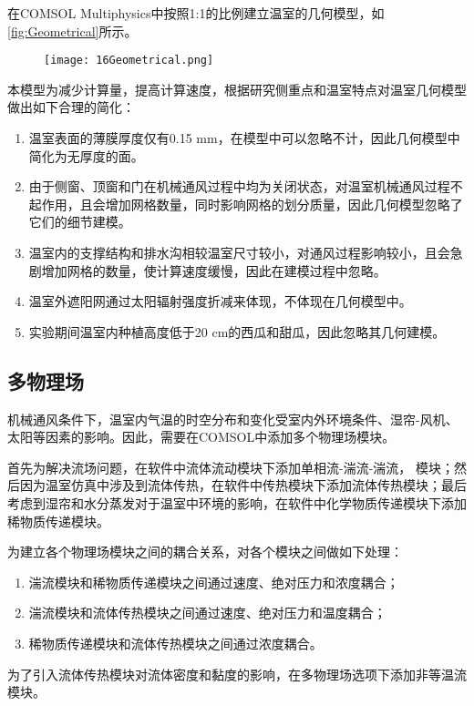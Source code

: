 在COMSOL Multiphysics中按照1:1的比例建立温室的几何模型，如\ref{fig:Geometrical}所示。
 	  	\begin{figure}[!htp]
  			\centering
 			\texttt{[image: 16Geometrical.png]}
		\end{figure}
本模型为减少计算量，提高计算速度，根据研究侧重点和温室特点对温室几何模型做出如下合理的简化：
	\begin{enumerate}
		\item 温室表面的薄膜厚度仅有0.15 mm，在模型中可以忽略不计，因此几何模型中简化为无厚度的面。
		\item 由于侧窗、顶窗和门在机械通风过程中均为关闭状态，对温室机械通风过程不起作用，且会增加网格数量，同时影响网格的划分质量，因此几何模型忽略了它们的细节建模。
		\item 温室内的支撑结构和排水沟相较温室尺寸较小，对通风过程影响较小，且会急剧增加网格的数量，使计算速度缓慢，因此在建模过程中忽略。
		\item 温室外遮阳网通过太阳辐射强度折减来体现，不体现在几何模型中。
		\item 实验期间温室内种植高度低于20 cm的西瓜和甜瓜，因此忽略其几何建模。
	\end{enumerate}
	
	\subsection{多物理场}
	机械通风条件下，温室内气温的时空分布和变化受室内外环境条件、湿帘-风机、太阳等因素的影响。因此，需要在COMSOL中添加多个物理场模块。
	
首先为解决流场问题，在软件中流体流动模块下添加单相流-湍流-湍流， 模块；然后因为温室仿真中涉及到流体传热，在软件中传热模块下添加流体传热模块；最后考虑到湿帘和水分蒸发对于温室中环境的影响，在软件中化学物质传递模块下添加稀物质传递模块。

为建立各个物理场模块之间的耦合关系，对各个模块之间做如下处理：
	\begin{enumerate}
		\item 湍流模块和稀物质传递模块之间通过速度、绝对压力和浓度耦合；
		\item 湍流模块和流体传热模块之间通过速度、绝对压力和温度耦合；
		\item 稀物质传递模块和流体传热模块之间通过浓度耦合。
	\end{enumerate}
为了引入流体传热模块对流体密度和黏度的影响，在多物理场选项下添加非等温流模块。

